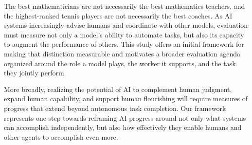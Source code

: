 
The best mathematicians are not necessarily the best mathematics teachers, and the highest-ranked tennis players are not necessarily the best coaches. As AI
systems increasingly advise humans and coordinate with other models, evaluation
must measure not only a model's ability to automate tasks, but also its capacity
to augment the performance of others. This study offers an initial framework
for making that distinction measurable and motivates a broader evaluation
agenda organized around the role a model plays, the worker it supports, and the
task they jointly perform. 

More broadly, realizing the potential of AI to complement human judgment, expand human capability, and support human
flourishing will require measures of progress that extend beyond autonomous
task completion. Our framework represents one step towards reframing AI
progress around not only what systems can accomplish independently, but also
how effectively they enable humans and other agents to accomplish even more.

